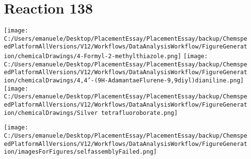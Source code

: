 \documentclass{article}%
\begin{document}
\section*{Reaction 138}%
%
\begin{scheme}[H]%
\begin{minipage}{0.5\textwidth}%
\texttt{[image: C:/Users/emanuele/Desktop/PlacementEssay/PlacementEssay/backup/ChemspeedPlatformAllVersions/V12/Workflows/DataAnalysisWorkflow/FigureGeneration/chemicalDrawings/4-Formyl-2-methylthiazole.png]}%
\texttt{[image: C:/Users/emanuele/Desktop/PlacementEssay/PlacementEssay/backup/ChemspeedPlatformAllVersions/V12/Workflows/DataAnalysisWorkflow/FigureGeneration/chemicalDrawings/4,4'-(9H-AdamantaeFlurene-9,9diyl)dianiline.png]}%
\texttt{[image: C:/Users/emanuele/Desktop/PlacementEssay/PlacementEssay/backup/ChemspeedPlatformAllVersions/V12/Workflows/DataAnalysisWorkflow/FigureGeneration/chemicalDrawings/Silver tetrafluoroborate.png]}%
\end{minipage}%
\begin{minipage}{0.5\textwidth}%
\begin{center}%
\texttt{[image: C:/Users/emanuele/Desktop/PlacementEssay/PlacementEssay/backup/ChemspeedPlatformAllVersions/V12/Workflows/DataAnalysisWorkflow/FigureGeneration/imagesForFigures/selfassemblyFailed.png]}%
\end{center}%
\end{minipage}%
\caption{Self-assembly of components 1, 13, with Silver(I) in a 3.0:1.5:1.0 molar ratio in CH$_3$CN at 60\textdegree C for 40h. These are the reagents (starting materials) for reaction 138.}%
\end{scheme}%
\end{document}
